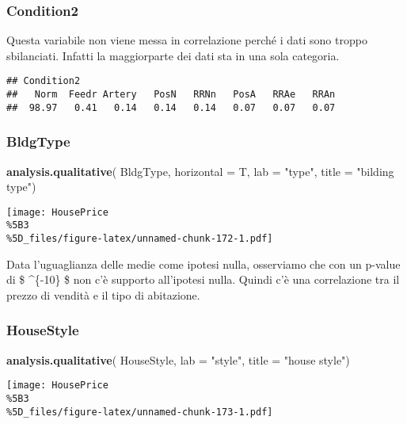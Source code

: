 \documentclass[
]{article}
\newenvironment{Shaded}{\begin{snugshade}}{\end{snugshade}}
\newcommand{\AttributeTok}[1]{\textcolor[rgb]{0.13,0.29,0.53}{#1}}
\newcommand{\FunctionTok}[1]{\textcolor[rgb]{0.13,0.29,0.53}{\textbf{#1}}}
\newcommand{\NormalTok}[1]{#1}
\newcommand{\StringTok}[1]{\textcolor[rgb]{0.31,0.60,0.02}{#1}}
\begin{document}
\subsubsection{Condition2}\label{condition2-1}

Questa variabile non viene messa in correlazione perché i dati sono
troppo sbilanciati. Infatti la maggiorparte dei dati sta in una sola
categoria.

\begin{verbatim}
## Condition2
##   Norm  Feedr Artery   PosN   RRNn   PosA   RRAe   RRAn 
##  98.97   0.41   0.14   0.14   0.14   0.07   0.07   0.07
\end{verbatim}

\subsubsection{BldgType}\label{bldgtype-1}

\begin{Shaded}
\begin{Highlighting}[]
\FunctionTok{analysis.qualitative}\NormalTok{(}
\NormalTok{    BldgType,}
    \AttributeTok{horizontal =}\NormalTok{ T,}
    \AttributeTok{lab =} \StringTok{"type"}\NormalTok{,}
    \AttributeTok{title =} \StringTok{"bilding type"}\NormalTok{)}
\end{Highlighting}
\end{Shaded}

\texttt{[image: HousePrice\\\%5B3\\\%5D\_files/figure-latex/unnamed-chunk-172-1.pdf]}

Data l'uguaglianza delle medie come ipotesi nulla, osserviamo che con un
p-value di \$ \^{}\{-10\} \$ non c'è supporto all'ipotesi
nulla. Quindi c'è una correlazione tra il prezzo di vendità e il tipo di
abitazione.

\subsubsection{HouseStyle}\label{housestyle-1}

\begin{Shaded}
\begin{Highlighting}[]
\FunctionTok{analysis.qualitative}\NormalTok{(}
\NormalTok{    HouseStyle,}
    \AttributeTok{lab =} \StringTok{"style"}\NormalTok{,}
    \AttributeTok{title =} \StringTok{"house style"}\NormalTok{)}
\end{Highlighting}
\end{Shaded}

\texttt{[image: HousePrice\\\%5B3\\\%5D\_files/figure-latex/unnamed-chunk-173-1.pdf]}
\end{document}
